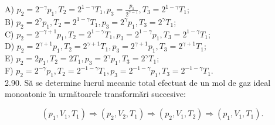 \documentclass[10pt]{article}
\begin{document}
A) $p_{2}=2^{-\gamma} p_{1}, T_{2}=2^{1-\gamma} T_{1}, p_{3}=\frac{p_{1}}{2^{\gamma-1}}, T_{3}=2^{1-\gamma} T_{1}$;\\
B) $p_{2}=2^{\gamma} p_{1}, T_{2}=2^{1-\gamma} T_{1}, p_{3}=2^{\gamma} p_{1}, T_{3}=2^{\gamma} T_{1}$;\\
C) $p_{2}=2^{-\gamma+1} p_{1}, T_{2}=2^{1-\gamma} T_{1}, p_{3}=2^{1-\gamma} p_{1}, T_{3}=2^{1-\gamma} T_{1}$;\\
D) $p_{2}=2^{\gamma+1} p_{1}, T_{2}=2^{\gamma+1} T_{1}, p_{3}=2^{\gamma+1} p_{1}, T_{3}=2^{\gamma+1} T_{1}$;\\
E) $p_{2}=2 p_{1}, T_{2}=2 T_{1}, p_{3}=2^{\gamma} p_{1}, T_{3}=2^{\gamma} T_{1}$;\\
F) $p_{2}=2^{-\gamma} p_{1}, T_{2}=2^{-1-\gamma} T_{1}, p_{3}=2^{-1-\gamma} p_{1}, T_{3}=2^{-1-\gamma} T_{1}$.\\
2.90. Să se determine lucrul mecanic total efectuat de un mol de gaz ideal monoatonic în următoarele transformări succesive:

$$
\left(p_{1}, V_{1}, T_{1}\right) \Rightarrow\left(p_{2}, V_{2}, T_{1}\right) \Rightarrow\left(p_{2}, V_{1}, T_{2}\right) \Rightarrow\left(p_{1}, V_{1}, T_{1}\right) .
$$
\end{document}
